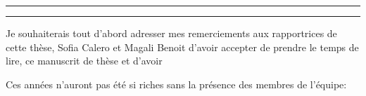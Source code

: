 \begin{otherlanguage}{french}

\hrule\relax
\vspace*{.9\baselineskip}%
\raggedright{\huge{}}\par%
\vspace*{1.1\baselineskip}%
\hrule\relax
\vspace*{\baselineskip}%
\thispagestyle{empty}

\begingroup
\itshape

Je souhaiterais tout d'abord adresser mes remerciements aux rapportrices de cette thèse, Sofia Calero et Magali Benoit d'avoir accepter de prendre le temps de lire, ce manuscrit de thèse et d'avoir 




Ces années n'auront pas été si riches sans la présence des membres de l'équipe:





\endgroup

\clearpage
\mbox{}
\thispagestyle{empty}
\clearpage

%
%
%
%
%
%
%

\end{otherlanguage}

